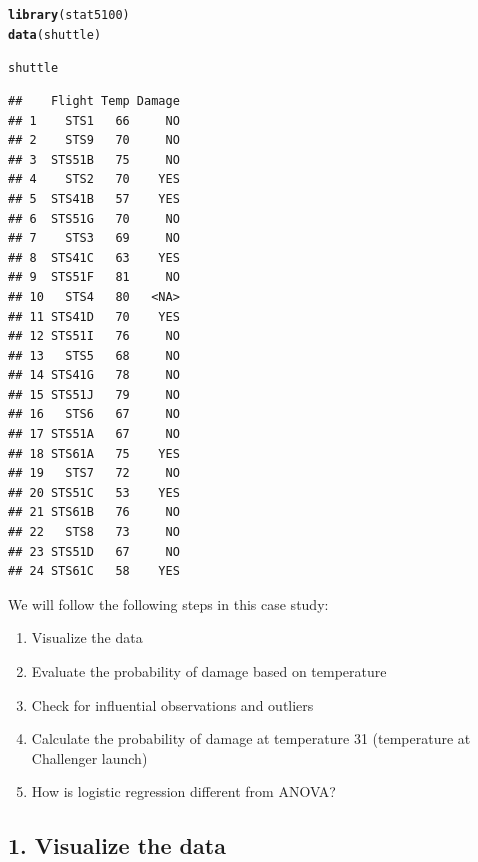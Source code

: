\documentclass{article}\usepackage[]{graphicx}\usepackage[]{color}
\makeatletter
\newcommand{\hlstd}[1]{\textcolor[rgb]{0.345,0.345,0.345}{#1}}%
\newcommand{\hlkwd}[1]{\textcolor[rgb]{0.737,0.353,0.396}{\textbf{#1}}}%
\newenvironment{kframe}{%
 \def\at@end@of@kframe{}%
 \ifinner\ifhmode%
  \def\at@end@of@kframe{\end{minipage}}%
  \begin{minipage}{\columnwidth}%
 \fi\fi%
 \def\FrameCommand##1{\hskip\@totalleftmargin \hskip-\fboxsep
 \colorbox{shadecolor}{##1}\hskip-\fboxsep
     \hskip-\linewidth \hskip-\@totalleftmargin \hskip\columnwidth}%
 \MakeFramed {\advance\hsize-\width
   \@totalleftmargin\z@ \linewidth\hsize
   \@setminipage}}%
 {\par\unskip\endMakeFramed%
 \at@end@of@kframe}
\newenvironment{knitrout}{}{} %
\makeatother
\begin{document}
\begin{knitrout}
\color{fgcolor}\begin{kframe}
\begin{alltt}
\hlkwd{library}\hlstd{(stat5100)}
\hlkwd{data}\hlstd{(shuttle)}

\hlstd{shuttle}
\end{alltt}
\begin{verbatim}
##    Flight Temp Damage
## 1    STS1   66     NO
## 2    STS9   70     NO
## 3  STS51B   75     NO
## 4    STS2   70    YES
## 5  STS41B   57    YES
## 6  STS51G   70     NO
## 7    STS3   69     NO
## 8  STS41C   63    YES
## 9  STS51F   81     NO
## 10   STS4   80   <NA>
## 11 STS41D   70    YES
## 12 STS51I   76     NO
## 13   STS5   68     NO
## 14 STS41G   78     NO
## 15 STS51J   79     NO
## 16   STS6   67     NO
## 17 STS51A   67     NO
## 18 STS61A   75    YES
## 19   STS7   72     NO
## 20 STS51C   53    YES
## 21 STS61B   76     NO
## 22   STS8   73     NO
## 23 STS51D   67     NO
## 24 STS61C   58    YES
\end{verbatim}
\end{kframe}
\end{knitrout}

We will follow the following steps in this case study:

\begin{enumerate}
\item Visualize the data
\item Evaluate the probability of damage based on temperature
\item Check for influential observations and outliers
\item Calculate the probability of damage at temperature 31 (temperature at Challenger launch)
\item How is logistic regression different from ANOVA?
\end{enumerate}

\subsection*{1. Visualize the data}
\end{document}
